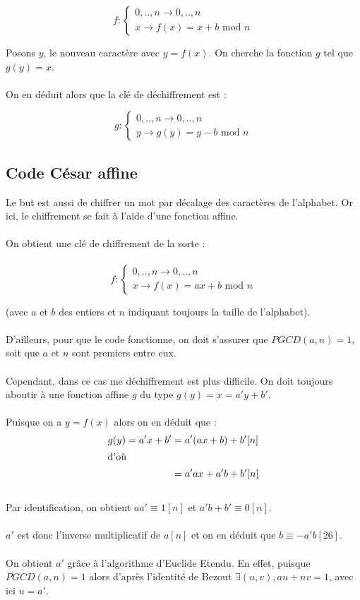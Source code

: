 \documentclass[12pt,french,titlepage]{article}
\begin{document}
	$$
	f:\left\{
	\begin{array}{l}
	{0,..,n} \rightarrow {0,..,n}\\
	x \rightarrow f(x)=x + b\text{ mod } n
	\end{array}	
	\right.
	$$
	
	\medskip
	
	Posons $y$, le nouveau caractère avec $y=f(x)$. On cherche la fonction $g$ tel que $g(y)=x$.\\
	\\
	On en déduit alors que la clé de déchiffrement est :
	
	$$
	g:\left\{
	\begin{array}{l}
	{0,..,n} \rightarrow {0,..,n}\\
	y \rightarrow g(y)=y - b\text{ mod } n
	\end{array}	
	\right.
	$$
	
	
	\subsection{Code César affine}
	
	Le but est aussi de chiffrer un mot par décalage des caractères de l'alphabet. Or ici, le chiffrement se fait à l'aide d'une fonction affine.\\
	\\
	On obtient une clé de chiffrement de la sorte :\\ 
	\\
	
	$$
	f:\left\{
	\begin{array}{l}
	{0,..,n} \rightarrow {0,..,n}\\
	x \rightarrow f(x)=ax + b\text{ mod } n
	\end{array}	
	\right.
	$$
	
	(avec $a$ et $b$ des entiers et $n$ indiquant toujours la taille de l'alphabet).\\
	\\
	D'ailleurs, pour que le code fonctionne, on doit s'assurer que $PGCD(a,n)=1$, soit que $a$ et $n$ sont premiers entre eux.\\
	\\
	Cependant, dans ce cas me déchiffrement est plus difficile. On doit toujours aboutir à une fonction affine $g$ du type $g(y) =x=a'y+b'$.\\
	\\
	Puisque on a $y=f(x)$ alors on en déduit que :
	\begin{align*}
	g(y)=a'x+b'&=a'(ax+b)+b'[n]\\
	\intertext{d'où}
	&=a'ax+a'b+b'[n]
	\end{align*} 
	\\
	Par identification, on obtient $aa'\equiv1[n]$ et $a'b+b' \equiv 0[n]$.\\
	\\
	$a'$ est donc l'inverse multiplicatif de $a[n]$ et on en déduit que $b\equiv -a'b[26]$.\\
	\\
	On obtient $a'$ grâce à l'algorithme d'Euclide Etendu. En effet, puisque $PGCD(a,n)=1$ alors d'après l'identité de Bezout $\exists(u,v), au+nv=1$, avec ici $u=a'$.
\end{document}
